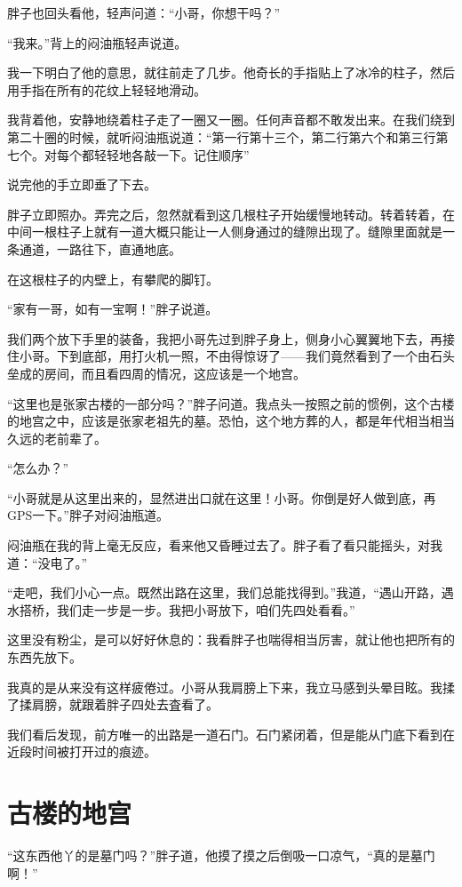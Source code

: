 胖子也回头看他，轻声问道：“小哥，你想干吗？”

“我来。”背上的闷油瓶轻声说道。

我一下明白了他的意思，就往前走了几步。他奇长的手指贴上了冰冷的柱子，然后用手指在所有的花纹上轻轻地滑动。

我背着他，安静地绕着柱子走了一圈又一圈。任何声音都不敢发出来。在我们绕到第二十圈的时候，就听闷油瓶说道：“第一行第十三个，第二行第六个和第三行第七个。对每个都轻轻地各敲一下。记住顺序”

说完他的手立即垂了下去。

胖子立即照办。弄完之后，忽然就看到这几根柱子开始缓慢地转动。转着转着，在中间一根柱子上就有一道大概只能让一人侧身通过的缝隙出现了。缝隙里面就是一条通道，一路往下，直通地底。

在这根柱子的内壁上，有攀爬的脚钉。

“家有一哥，如有一宝啊！”胖子说道。

我们两个放下手里的装备，我把小哥先过到胖子身上，侧身小心翼翼地下去，再接住小哥。下到底部，用打火机一照，不由得惊讶了——我们竟然看到了一个由石头垒成的房间，而且看四周的情况，这应该是一个地宫。

“这里也是张家古楼的一部分吗？”胖子问道。我点头一按照之前的惯例，这个古楼的地宫之中，应该是张家老祖先的墓。恐怕，这个地方葬的人，都是年代相当相当久远的老前辈了。

“怎么办？”

“小哥就是从这里出来的，显然进出口就在这里！小哥。你倒是好人做到底，再GPS一下。”胖子对闷油瓶道。

闷油瓶在我的背上毫无反应，看来他又昏睡过去了。胖子看了看只能摇头，对我道：“没电了。”

“走吧，我们小心一点。既然出路在这里，我们总能找得到。”我道，“遇山开路，遇水搭桥，我们走一步是一步。我把小哥放下，咱们先四处看看。”

这里没有粉尘，是可以好好休息的：我看胖子也喘得相当厉害，就让他也把所有的东西先放下。

我真的是从来没有这样疲倦过。小哥从我肩膀上下来，我立马感到头晕目眩。我揉了揉肩膀，就跟着胖子四处去査看了。

我们看后发现，前方唯一的出路是一道石门。石门紧闭着，但是能从门底下看到在近段时间被打开过的痕迹。

\chapter{古楼的地宫}

“这东西他丫的是墓门吗？”胖子道，他摸了摸之后倒吸一口凉气，“真的是墓门啊！”


